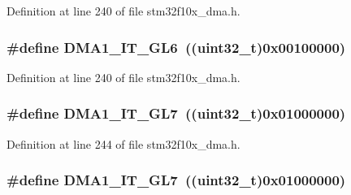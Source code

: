 Definition at line 240 of file stm32f10x\+\_\+dma.\+h.

\subsubsection[{\texorpdfstring{D\+M\+A1\+\_\+\+I\+T\+\_\+\+G\+L6}{DMA1_IT_GL6}}]{\setlength{\rightskip}{0pt plus 5cm}\#define D\+M\+A1\+\_\+\+I\+T\+\_\+\+G\+L6~(({\bf uint32\+\_\+t})0x00100000)}\hypertarget{group___d_m_a__interrupts__definition_ga623e986da940dbdbc4155f0c1fc4eae8}{}\label{group___d_m_a__interrupts__definition_ga623e986da940dbdbc4155f0c1fc4eae8}


Definition at line 240 of file stm32f10x\+\_\+dma.\+h.

\subsubsection[{\texorpdfstring{D\+M\+A1\+\_\+\+I\+T\+\_\+\+G\+L7}{DMA1_IT_GL7}}]{\setlength{\rightskip}{0pt plus 5cm}\#define D\+M\+A1\+\_\+\+I\+T\+\_\+\+G\+L7~(({\bf uint32\+\_\+t})0x01000000)}\hypertarget{group___d_m_a__interrupts__definition_ga3df39a2f922a5f33ebf1ba3f1adfc15d}{}\label{group___d_m_a__interrupts__definition_ga3df39a2f922a5f33ebf1ba3f1adfc15d}


Definition at line 244 of file stm32f10x\+\_\+dma.\+h.

\subsubsection[{\texorpdfstring{D\+M\+A1\+\_\+\+I\+T\+\_\+\+G\+L7}{DMA1_IT_GL7}}]{\setlength{\rightskip}{0pt plus 5cm}\#define D\+M\+A1\+\_\+\+I\+T\+\_\+\+G\+L7~(({\bf uint32\+\_\+t})0x01000000)}\hypertarget{group___d_m_a__interrupts__definition_ga3df39a2f922a5f33ebf1ba3f1adfc15d}{}\label{group___d_m_a__interrupts__definition_ga3df39a2f922a5f33ebf1ba3f1adfc15d}


